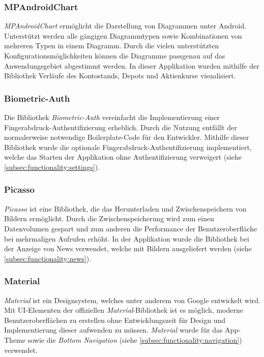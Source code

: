 \documentclass[a4paper]{article}
\begin{document}
\subsubsection{MPAndroidChart}
\label{subsubsec:technologies:bibs:mpandroidchart}
\textit{MPAndroidChart} \autocite{mpandroidchart} ermöglicht die Darstellung von Diagrammen unter Android. Unterstützt werden alle gängigen Diagrammtypen sowie Kombinationen von mehreren Typen in einem Diagramm. Durch die vielen unterstützten Konfigurationsmöglichkeiten können die Diagramme passgenau auf das Anwendungsgebiet abgestimmt werden. In dieser Applikation wurden mithilfe der Bibliothek Verläufe des Kontostands, Depots und Aktienkurse visualisiert.


\subsubsection{Biometric-Auth}
\label{subsubsec:technologies:bibs:biometricauth}
Die Bibliothek \textit{Biometric-Auth} \autocite{biometricauth} vereinfacht die Implementierung einer Finger\-abdruck-Authentifizierung erheblich. Durch die Nutzung entfällt der normalerweise notwendige Boilerplate-Code für den Entwickler. Mithilfe dieser Bibliothek wurde die optionale Fingerabdruck-Authentifizierung implementiert, welche das Starten der Applikation ohne Authentifizierung verweigert (siehe \autoref{subsec:functionality:settings}).


\subsubsection{Picasso}
\label{subsubsec:technologies:bibs:picasso}
\textit{Picasso} \autocite{picasso} ist eine Bibliothek, die das Herunterladen und Zwischenspeichern von Bildern ermöglicht. Durch die Zwischenspeicherung wird zum einen Datenvolumen gespart und zum anderen die Performance der Benutzeroberfläche bei mehrmaligen Aufrufen erhöht. In der Applikation wurde die Bibliothek bei der Anzeige von News verwendet, welche mit Bildern ausgeliefert werden (siehe \autoref{subsec:functionality:news}).


\subsubsection{Material}
\label{subsubsec:technologies:bibs:material}
\textit{Material} ist ein Designsystem, welches unter anderem von Google entwickelt wird.
Mit UI-Elementen der offiziellen \textit{Material}-Bibliothek ist es möglich, moderne Benutzeroberflächen zu erstellen ohne Entwicklungszeit für Design und Implementierung dieser aufwenden zu müssen.
\textit{Material} wurde für das App-Theme sowie die \textit{Bottom Navigation} (siehe \autoref{subsec:functionality:navigation}) verwendet.
\end{document}

